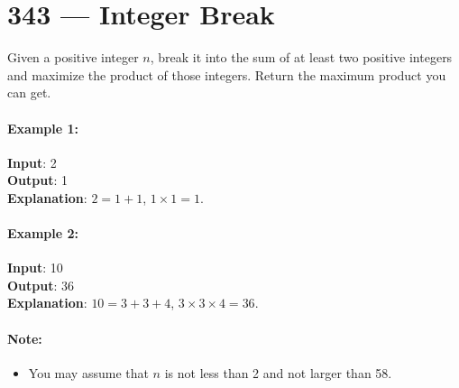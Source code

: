 \section{343 --- Integer Break}
Given a positive integer $ n $, break it into the sum of at least two positive integers and maximize the product of those integers. Return the maximum product you can get.

\paragraph{Example 1:}

\begin{flushleft}
\textbf{Input}: 2
\\
\textbf{Output}: 1
\\
\textbf{Explanation}: $2 = 1 + 1$, $1 \times 1 = 1$.
\end{flushleft}

\paragraph{Example 2:}

\begin{flushleft}
\textbf{Input}: 10
\\
\textbf{Output}: 36
\\
\textbf{Explanation}: $10 = 3 + 3 + 4$, $3 \times 3 \times 4 = 36$.
\end{flushleft}

\paragraph{Note:} 
\begin{itemize}
\item You may assume that $ n $ is not less than 2 and not larger than 58.
\end{itemize}

